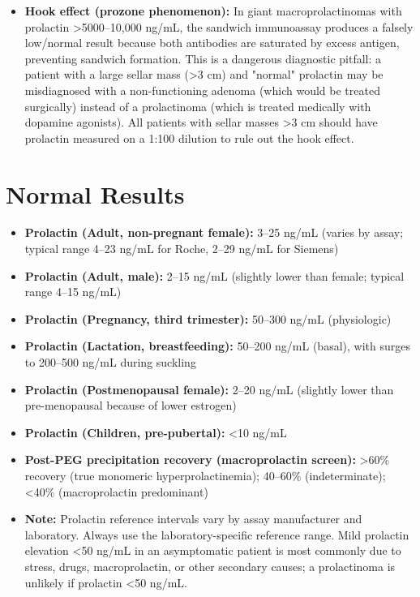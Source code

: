 \begin{itemize}
  \item \textbf{Hook effect (prozone phenomenon):} In giant macroprolactinomas with prolactin >5000--10,000 ng/mL, the sandwich immunoassay produces a falsely low/normal result because both antibodies are saturated by excess antigen, preventing sandwich formation. This is a dangerous diagnostic pitfall: a patient with a large sellar mass (>3 cm) and "normal" prolactin may be misdiagnosed with a non-functioning adenoma (which would be treated surgically) instead of a prolactinoma (which is treated medically with dopamine agonists). All patients with sellar masses >3 cm should have prolactin measured on a 1:100 dilution to rule out the hook effect.
\end{itemize}

\section*{Normal Results}
\begin{itemize}
  \item \textbf{Prolactin (Adult, non-pregnant female):} 3--25 ng/mL (varies by assay; typical range 4--23 ng/mL for Roche, 2--29 ng/mL for Siemens)
  \item \textbf{Prolactin (Adult, male):} 2--15 ng/mL (slightly lower than female; typical range 4--15 ng/mL)
  \item \textbf{Prolactin (Pregnancy, third trimester):} 50--300 ng/mL (physiologic)
  \item \textbf{Prolactin (Lactation, breastfeeding):} 50--200 ng/mL (basal), with surges to 200--500 ng/mL during suckling
  \item \textbf{Prolactin (Postmenopausal female):} 2--20 ng/mL (slightly lower than pre-menopausal because of lower estrogen)
  \item \textbf{Prolactin (Children, pre-pubertal):} <10 ng/mL
  \item \textbf{Post-PEG precipitation recovery (macroprolactin screen):} >60\% recovery (true monomeric hyperprolactinemia); 40--60\% (indeterminate); <40\% (macroprolactin predominant)
  \item \textbf{Note:} Prolactin reference intervals vary by assay manufacturer and laboratory. Always use the laboratory-specific reference range. Mild prolactin elevation <50 ng/mL in an asymptomatic patient is most commonly due to stress, drugs, macroprolactin, or other secondary causes; a prolactinoma is unlikely if prolactin <50 ng/mL.
\end{itemize}

